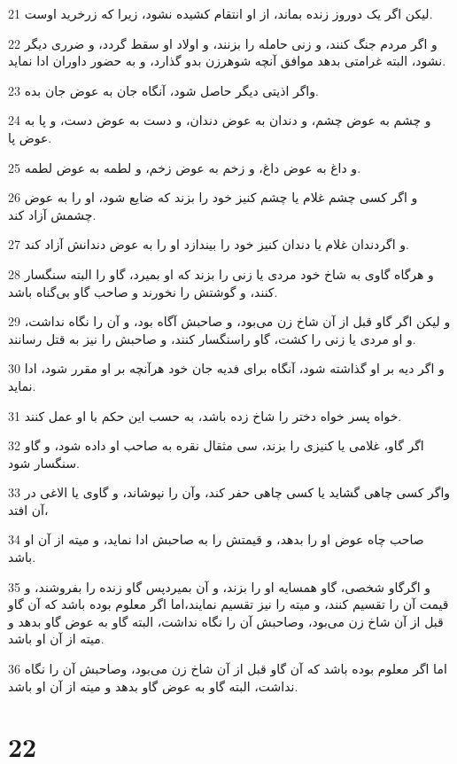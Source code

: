 \par 21 لیکن اگر یک دوروز زنده بماند، از او انتقام کشیده نشود، زیرا که زرخرید اوست.
\par 22 و اگر مردم جنگ کنند، و زنی حامله را بزنند، و اولاد او سقط گردد، و ضرری دیگر نشود، البته غرامتی بدهد موافق آنچه شوهرزن بدو گذارد، و به حضور داوران ادا نماید.
\par 23 واگر اذیتی دیگر حاصل شود، آنگاه جان به عوض جان بده.
\par 24 و چشم به عوض چشم، و دندان به عوض دندان، و دست به عوض دست، و پا به عوض پا.
\par 25 و داغ به عوض داغ، و زخم به عوض زخم، و لطمه به عوض لطمه.
\par 26 و اگر کسی چشم غلام یا چشم کنیز خود را بزند که ضایع شود، او را به عوض چشمش آزاد کند.
\par 27 و اگردندان غلام یا دندان کنیز خود را بیندازد او را به عوض دندانش آزاد کند.
\par 28 و هرگاه گاوی به شاخ خود مردی یا زنی را بزند که او بمیرد، گاو را البته سنگسار کنند، و گوشتش را نخورند و صاحب گاو بی‌گناه باشد.
\par 29 و لیکن اگر گاو قبل از آن شاخ زن می‌بود، و صاحبش آگاه بود، و آن را نگاه نداشت، و او مردی یا زنی را کشت، گاو راسنگسار کنند، و صاحبش را نیز به قتل رسانند.
\par 30 و اگر دیه بر او گذاشته شود، آنگاه برای فدیه جان خود هرآنچه بر او مقرر شود، ادا نماید.
\par 31 خواه پسر خواه دختر را شاخ زده باشد، به حسب این حکم با او عمل کنند.
\par 32 اگر گاو، غلامی یا کنیزی را بزند، سی مثقال نقره به صاحب او داده شود، و گاو سنگسار شود.
\par 33 واگر کسی چاهی گشاید یا کسی چاهی حفر کند، وآن را نپوشاند، و گاوی یا الاغی در آن افتد،
\par 34 صاحب چاه عوض او را بدهد، و قیمتش را به صاحبش ادا نماید، و میته از آن او باشد.
\par 35 و اگرگاو شخصی، گاو همسایه او را بزند، و آن بمیردپس گاو زنده را بفروشند، و قیمت آن را تقسیم کنند، و میته را نیز تقسیم نمایند،اما اگر معلوم بوده باشد که آن گاو قبل از آن شاخ زن می‌بود، وصاحبش آن را نگاه نداشت، البته گاو به عوض گاو بدهد و میته از آن او باشد.
\par 36 اما اگر معلوم بوده باشد که آن گاو قبل از آن شاخ زن می‌بود، وصاحبش آن را نگاه نداشت، البته گاو به عوض گاو بدهد و میته از آن او باشد.
 
\chapter{22}

